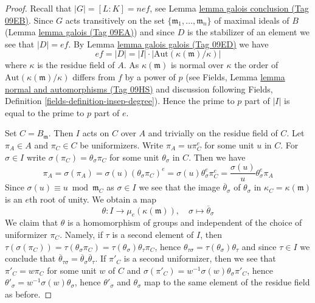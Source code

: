 \documentclass{amsart}
\theoremstyle{plain}
\theoremstyle{definition}
\theoremstyle{remark}
\numberwithin{equation}{subsection}
\begin{document}
\begin{proof}
Recall that $|G| = [L : K] = nef$, see Lemma \href{https://stacks.math.columbia.edu/tag/09EB}{lemma galois conclusion (Tag 09EB)}.
Since $G$ acts transitively on the set
$\{\mathfrak m_1, \ldots, \mathfrak m_n\}$ of maximal ideals of $B$
(Lemma \href{https://stacks.math.columbia.edu/tag/09EA}{lemma galois (Tag 09EA)})
and since $D$ is the stabilizer of an element we see that $|D| = ef$.
By Lemma \href{https://stacks.math.columbia.edu/tag/09ED}{lemma galois galois (Tag 09ED)} we have
$$
ef = |D| = |I| \cdot |\text{Aut}(\kappa(\mathfrak m)/\kappa)|
$$
where $\kappa$ is the residue field of $A$.
As $\kappa(\mathfrak m)$ is normal over $\kappa$ the order of
$\text{Aut}(\kappa(\mathfrak m)/\kappa)$ differs from $f$ by
a power of $p$ (see
Fields, Lemma \href{https://stacks.math.columbia.edu/tag/09HS}{lemma normal and automorphisms (Tag 09HS)}
and discussion following
Fields, Definition \ref{fields-definition-insep-degree}).
Hence the prime to $p$ part
of $|I|$ is equal to the prime to $p$ part of $e$.

\medskip\noindent
Set $C = B_\mathfrak m$. Then $I$ acts on $C$ over $A$ and trivially
on the residue field of $C$. Let $\pi_A \in A$ and $\pi_C \in C$ be
uniformizers. Write $\pi_A = u \pi_C^e$ for some unit $u$ in $C$.
For $\sigma \in I$ write $\sigma(\pi_C) = \theta_\sigma \pi_C$ for some
unit $\theta_\sigma$ in $C$. Then we have
$$
\pi_A = \sigma(\pi_A) = \sigma(u) (\theta_\sigma \pi_C)^e
= \sigma(u) \theta_\sigma^e \pi_C^e = \frac{\sigma(u)}{u} \theta_\sigma^e \pi_A
$$
Since $\sigma(u) \equiv u \bmod \mathfrak m_C$ as $\sigma \in I$
we see that the image $\overline{\theta}_\sigma$
of $\theta_\sigma$ in $\kappa_C = \kappa(\mathfrak m)$
is an $e$th root of unity.
We obtain a map
\begin{equation}
\label{equation-inertia-character}
\theta : I \longrightarrow \mu_e(\kappa(\mathfrak m)),\quad
\sigma \mapsto \overline{\theta}_\sigma
\end{equation}
We claim that $\theta$ is a homomorphism of groups and independent
of the choice of uniformizer $\pi_C$. Namely, if $\tau$ is a second
element of $I$, then
$\tau(\sigma(\pi_C)) = \tau(\theta_\sigma \pi_C) =
\tau(\theta_\sigma) \theta_\tau \pi_C$, hence
$\theta_{\tau \sigma} = \tau(\theta_\sigma) \theta_\tau$ and
since $\tau \in I$ we conclude that
$\overline{\theta}_{\tau \sigma} =
\overline{\theta}_\sigma \overline{\theta}_\tau$.
If $\pi'_C$ is a second uniformizer, then we see
that $\pi'_C = w \pi_C$ for some unit $w$ of $C$ and
$\sigma(\pi'_C) = w^{-1}\sigma(w)\theta_\sigma \pi'_C$,
hence $\theta'_\sigma = w^{-1}\sigma(w)\theta_\sigma$,
hence $\theta'_\sigma$ and $\theta_\sigma$
map to the same element of the residue field as before.


\end{proof}
\end{document}

